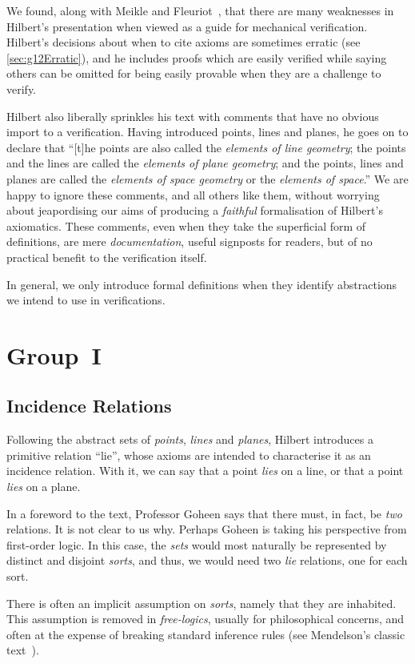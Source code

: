 We found, along with Meikle and Fleuriot~\cite{MeikleFleuriotFormalizingHilbert}, that there are many weaknesses in Hilbert's presentation when viewed as a guide for mechanical verification. Hilbert's decisions about when to cite axioms are sometimes erratic (see \ref{sec:g12Erratic}), and he includes proofs which are easily verified while saying others can be omitted for being easily provable when they are a challenge to verify.

Hilbert also liberally sprinkles his text with comments that have no obvious import to a verification. Having introduced points, lines and planes, he goes on to declare that ``[t]he points are also called the \emph{elements of line geometry}; the points and the lines are called the \emph{elements of plane geometry}; and the points, lines and planes are called the \emph{elements of space geometry} or the \emph{elements of space}.'' We are happy to ignore these comments, and all others like them, without worrying about jeapordising our aims of producing a \emph{faithful} formalisation of Hilbert's axiomatics. These comments, even when they take the superficial form of definitions, are mere \emph{documentation}, useful signposts for readers, but of no practical benefit to the verification itself.

In general, we only introduce formal definitions when they identify abstractions we intend to use in verifications.

\section{Group~I}
\subsection{Incidence Relations}
Following the abstract sets of \emph{points}, \emph{lines} and \emph{planes}, Hilbert introduces a primitive  relation ``lie'', whose axioms are intended to characterise it as an incidence relation. With it, we can say that a point \emph{lies} on a line, or that a point \emph{lies} on a plane.

In a foreword to the text, Professor Goheen says that there must, in fact, be \emph{two} relations. It is not clear to us why. Perhaps Goheen is taking his perspective from first-order logic. In this case, the \emph{sets} would most naturally be represented by distinct and disjoint \emph{sorts}, and thus, we would need two \emph{lie} relations, one for each sort.

There is often an implicit assumption on \emph{sorts}, namely that they are inhabited. This assumption is removed in \emph{free-logics}, usually for philosophical concerns, and often at the expense of breaking standard inference rules (see Mendelson's classic text~\cite{Mendelson}).

